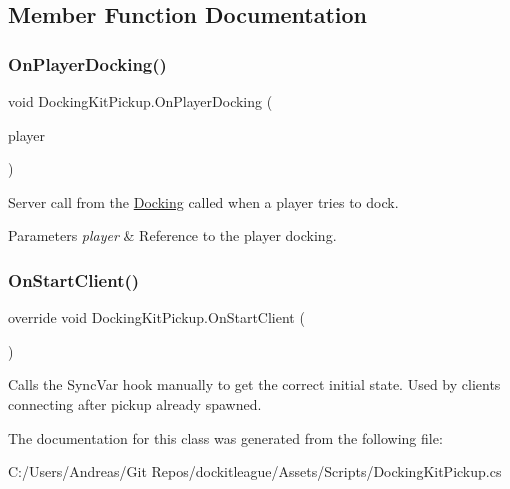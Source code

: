 \subsection{Member Function Documentation}
\hypertarget{class_docking_kit_pickup_a67744f685af4efb8875007dbb4451a28}{}\label{class_docking_kit_pickup_a67744f685af4efb8875007dbb4451a28} 
\subsubsection{\texorpdfstring{On\+Player\+Docking()}{OnPlayerDocking()}}
{\footnotesize\ttfamily void Docking\+Kit\+Pickup.\+On\+Player\+Docking (\begin{DoxyParamCaption}\item[{Game\+Object}]{player }\end{DoxyParamCaption})}



Server call from the \hyperlink{class_docking}{Docking} called when a player tries to dock. 


\begin{DoxyParams}{Parameters}
{\em player} & Reference to the player docking.\\
\hline
\end{DoxyParams}
\hypertarget{class_docking_kit_pickup_a69844bc6d4f3f82e8b9143b6865122c2}{}\label{class_docking_kit_pickup_a69844bc6d4f3f82e8b9143b6865122c2} 
\subsubsection{\texorpdfstring{On\+Start\+Client()}{OnStartClient()}}
{\footnotesize\ttfamily override void Docking\+Kit\+Pickup.\+On\+Start\+Client (\begin{DoxyParamCaption}{ }\end{DoxyParamCaption})}



Calls the Sync\+Var hook manually to get the correct initial state. Used by clients connecting after pickup already spawned. 



The documentation for this class was generated from the following file\+:\begin{DoxyCompactItemize}
\item 
C\+:/\+Users/\+Andreas/\+Git Repos/dockitleague/\+Assets/\+Scripts/Docking\+Kit\+Pickup.\+cs\end{DoxyCompactItemize}
